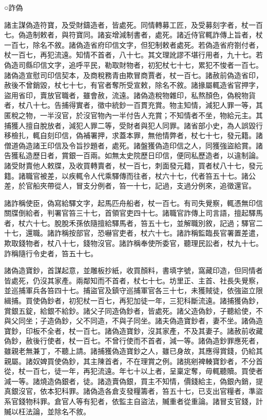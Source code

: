 
\begin{pinyinscope}

 ○詐偽



 諸主謀偽造符寶，及受財鑄造者，皆處死。同情轉募工匠，及受募刻字者，杖一百七。偽造制敕者，與符寶同。諸妄增減制書者，處死。諸近侍官輒詐傳上旨者，杖一百七，除名不敘。諸偽造省府印信文字，但犯制敕者處死。若偽造省府劄付者，杖一百七，再犯流遠。知情不首者，八十七。其文理訛謬不堪行用者，九十七。若偽造司縣印信文字，追呼平民，勒取財物者，初犯杖七十七，累犯不悛者一百七。諸偽造宣慰司印信契本，及商稅務青由欺冒商賈者，杖一百七。諸赦前偽造省印，赦後不曾銷毀，杖七十七，有官者奪所受宣敕，除名不敘。諸掾屬輒造省官押字，盜用省印，賣放官職者，雖會赦，流遠。諸偽造稅物雜印，私熬顏色，偽稅物貨者，杖八十七。告捕得實者，徵中統鈔一百貫充賞。物主知情，減犯人罪一等，其匿稅之物，一半沒官，於沒官物內一半付告人充賞；不知情者不坐，物給元主。其捕獲人擅自脫放者，減犯人罪二等，受財者與犯人同罪。諸省部小史，為人誤毀行移檢扎，輒自刻印信，偽補署押，求蓋本罪，無他情弊者，杖七十七，發元籍。諸僧道偽造諸王印信及令旨抄題者，處死。諸盤獲偽造印信之人，同獲強盜給賞。諸告獲私造歷日者，賞銀一百兩。如無太史院歷日印信，便同私歷造者，以違制論。諸受財賣他人敕牒，及收買轉賣者，杖一百七，刺面發元籍，買者杖八十七，發元籍。諸職官被差，以疾輒令人代乘驛傳而往者，杖六十七，代者笞五十七。諸公差，於官船夾帶從人，冒支分例者，笞一十七，記過，支過分例來，追徵還官。



 諸詐稱使臣，偽寫給驛文字，起馬匹舟船者，杖一百七。有司失覺察，輒憑無印信關牒倒給者，判署官笞三十七，首領官吏四十七。諸職官詐傳上司言語，擅起驛馬者，杖六十七。脫脫禾孫依隨擅給驛馬者，笞五十七，並解職別敘，記過；驛官二十七，還職。諸詐稱按部官，恐嚇官吏者，杖六十七。諸詐稱監臨長官署置差遣，欺取錢物者，杖八十七，錢物沒官。諸詐稱奉使所委官，聽理民訟者，杖九十七。詐稱隨行令史者，笞五十七。



 諸偽造寶鈔，首謀起意，並雕板抄紙，收買顏料，書填字號，窩藏印造，但同情者皆處死，仍沒其家產。兩鄰知而不首者，杖七十七。坊里正、主首、社長失覺察，並巡捕軍兵各笞四十七。捕盜官及鎮守巡捕軍官各三十七，未獲賊徒，依強盜立限緝捕。買使偽鈔者，初犯杖一百七，再犯加徒一年，三犯科斷流遠。諸捕獲偽鈔，賞銀五錠，給銀不給鈔。諸父子同造偽鈔者，皆處死。諸父造偽鈔，子聽給使，不與父同坐；子造偽鈔，父不同造，不與子同坐。諸夫偽造寶鈔者，妻不坐。諸偽造寶鈔，印板不全者，杖一百七。諸偽造寶鈔，沒其家產，不及其妻子。諸赦前收藏偽鈔，赦後行使者，杖一百七。不曾行使而不首者，減一等。諸偽造鈔罪應死者，雖親老無兼丁，不聽上請。諸捕獲偽造寶鈔之人，雖已身故，其應得賞錢，仍給其親屬。諸奴婢買使偽鈔，其主陳首者，不在理賞之例。諸挑剜裨輳寶鈔者，不分首從，杖一百七，徒一年，再犯流遠。年七十以上者，呈稟定奪，毋輒聽贖。買使者減一等。諸燒造偽銀者，徒。諸造賣偽銀，買主不知情，價錢給主，偽銀內銷，提真銀沒官，依本犯科罪。諸偽造各倉支發糧籌者，笞五十七，已支出官糧者，準盜系官錢物科罪。倉官人等有犯者，依監主自盜法，贓重者從重論。諸冒支官錢，計贓以枉法論，並除名不敘。




\end{pinyinscope}
